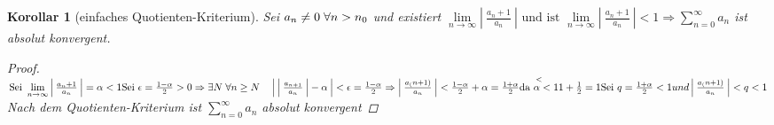 \documentclass[a4paper,titlepage,oneside]{article}
\def\fa{\ensuremath{\forall}}
\def\sp{\hspace{0,1cm}}
\newcommand{\suminf}[2][n]{\ensuremath{\sum_{#1= 0}^{\infty}{#2}}}
\renewcommand{\liminf}[2][n]{\ensuremath{\lim\limits_{#1 \rightarrow \infty}{#2}}}
\newcommand{\abs}[1]{\ensuremath{\left|\:#1\:\right|}}
\theoremstyle{thmstyle}
\newtheorem{korr}[satz]{Korollar}
\begin{document}
\begin{korr}[einfaches Quotienten-Kriterium]
Sei \(a_n \ne 0 \sp \fa n > n_0\) und existiert \(\liminf{\abs{\frac{a_n+1}{a_n}}}\text{ und ist }\liminf{\abs{\frac{a_n+1}{a_n}}} < 1
\Rightarrow \suminf{a_n}\) ist absolut konvergent.
\begin{proof}
\begin{math}
\text{Sei } \liminf{\abs{\frac{a_n+1}{a_n}}} = \alpha < 1 \\
\text{Sei } \epsilon = \frac{1 - \alpha}{2} > 0 \Rightarrow \exists N \sp \forall n \ge N \quad \abs{\abs{\frac{a_{n+1}}{a_n}} - \alpha} < \epsilon  = \frac{1-\alpha}{2}
\Rightarrow \abs{\frac{a_(n+1)}{a_n}} < \frac{1-\alpha}{2} + \alpha = \frac{1+\alpha}{2} \overset{<}{\text{da } \alpha < 1} 1+\frac{1}{2} = 1
\text{Sei } q = \frac{1 + \alpha}{2} < 1 und \abs{\frac{a_(n+1)}{a_n}} < q < 1
\end{math}
Nach dem Quotienten-Kriterium ist \suminf{a_n} absolut konvergent
\end{proof}
\end{korr}
\end{document}
